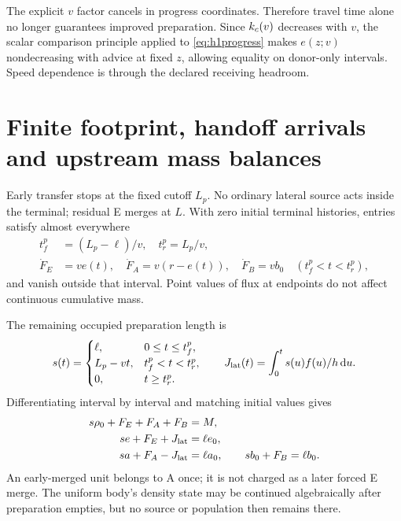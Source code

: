 The explicit $v$ factor cancels in progress coordinates. Therefore travel
time alone no longer guarantees improved preparation. Since $k_c(v)$
decreases with $v$, the scalar comparison principle applied to
\eqref{eq:h1progress} makes $e(z;v)$ nondecreasing with advice at fixed
$z$, allowing equality on donor-only intervals. Speed dependence is
through the declared receiving headroom.

\section{Finite footprint, handoff arrivals and upstream mass balances}
\label{sec:handoff}
Early transfer stops at the fixed cutoff $L_p$. No ordinary lateral source
acts inside the terminal; residual E merges at $L$. With zero initial
terminal histories, entries satisfy almost everywhere
\begin{align}
 t_f^p&=(L_p-\ell)/v,\quad t_r^p=L_p/v,\nonumber\\
 \dot F_E&=ve(t),\quad \dot F_A=v(r-e(t)),\quad\dot F_B=vb_0
       \quad(t_f^p<t<t_r^p), \label{eq:entry}
\end{align}
and vanish outside that interval. Point values of flux at endpoints do
not affect continuous cumulative mass.

The remaining occupied preparation length is
\begin{equation}
 s(t)=\begin{cases}
 \ell,&0\leq t\leq t_f^p,\\
 L_p-vt,&t_f^p<t<t_r^p,\\
 0,&t\geq t_r^p.
 \end{cases}\qquad
 J_{\rm lat}(t)=\int_0^t s(u)f(u)/h\,\mathrm d u. \label{eq:occupied}
\end{equation}
Differentiating interval by interval and matching initial values gives
\begin{align}
 s\rho_0+F_E+F_A+F_B&=M,\nonumber\\
 se+F_E+J_{\rm lat}&=\ell e_0,\nonumber\\
 sa+F_A-J_{\rm lat}&=\ell a_0,\qquad sb_0+F_B=\ell b_0.
 \label{eq:upstreammass}
\end{align}
An early-merged unit belongs to A once; it is not charged as a later forced
E merge. The uniform body's density state may be continued algebraically
after preparation empties, but no source or population then remains there.

